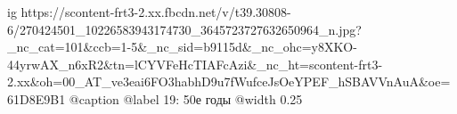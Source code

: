  
 
 
 
 

\ifcmt
  ig https://scontent-frt3-2.xx.fbcdn.net/v/t39.30808-6/270424501_10226583943174730_3645723727632650964_n.jpg?_nc_cat=101&ccb=1-5&_nc_sid=b9115d&_nc_ohc=y8XKO-44yrwAX_n6xR2&tn=lCYVFeHcTIAFcAzi&_nc_ht=scontent-frt3-2.xx&oh=00_AT_ve3eai6FO3habhD9u7fWufceJsOeYPEF_hSBAVVnAuA&oe=61D8E9B1
	@caption @label 19: 50е годы
  @width 0.25
\fi
